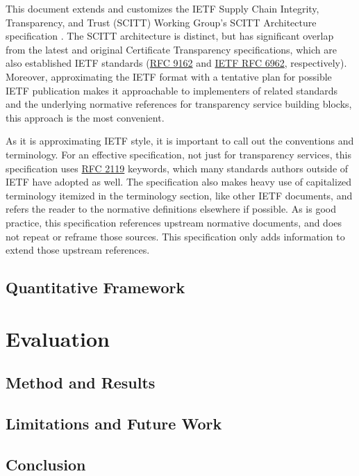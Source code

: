 \documentclass{jdf}
\begin{document}
This document extends and customizes the IETF Supply Chain Integrity, Transparency, and Trust (SCITT) Working Group's SCITT Architecture specification \citeyear{scitt25}. The SCITT architecture is distinct, but has significant overlap from the latest and original Certificate Transparency specifications, which are also established IETF standards (\href{https://datatracker.ietf.org/doc/html/rfc9162}{RFC 9162} and \href{https://datatracker.ietf.org/doc/html/rfc6962}{IETF RFC 6962}, respectively). Moreover, approximating the IETF format with a tentative plan for possible IETF publication makes it approachable to implementers of related standards and the underlying normative references for transparency service building blocks, this approach is the most convenient.

As it is approximating IETF style, it is important to call out the conventions and terminology. For an effective specification, not just for transparency services, this specification uses \href{https://datatracker.ietf.org/doc/html/rfc2119}{RFC 2119} keywords, which many standards authors outside of IETF have adopted as well. The specification also makes heavy use of capitalized terminology itemized in the terminology section, like other IETF documents, and refers the reader to the normative definitions elsewhere if possible. As is good practice, this specification references upstream normative documents, and does not repeat or reframe those sources. This specification only adds information to extend those upstream references.

\subsection{Quantitative Framework}

\section{Evaluation}

\subsection{Method and Results}

\subsection{Limitations and Future Work}

\subsection{Conclusion}
\end{document}
